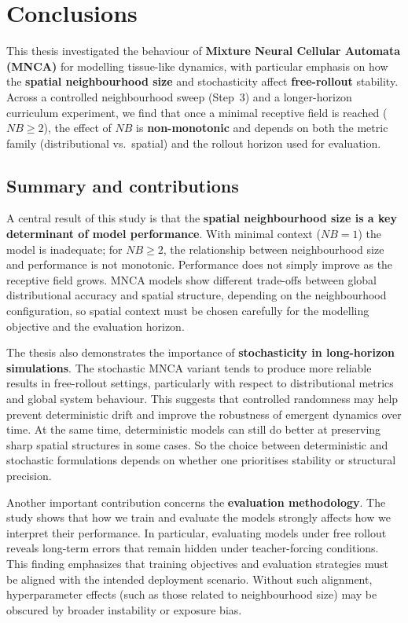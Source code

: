 \chapter{Conclusions}
\label{c:conc}

This thesis investigated the behaviour of \textbf{Mixture Neural Cellular Automata (MNCA)} for modelling tissue-like dynamics, with particular emphasis on how the \textbf{spatial neighbourhood size} and stochasticity affect \textbf{free-rollout} stability.
Across a controlled neighbourhood sweep (Step~3) and a longer-horizon curriculum experiment, we find that once a minimal receptive field is reached (\(NB\ge2\)), the effect of \(NB\) is \textbf{non-monotonic} and depends on both the metric family (distributional vs.\ spatial) and the rollout horizon used for evaluation.

\section{Summary and contributions}
\label{sec:conc:summary}

A central result of this study is that the \textbf{spatial neighbourhood size is a key determinant of model performance}.
With minimal context (\(NB=1\)) the model is inadequate; for \(NB \ge 2\), the relationship between neighbourhood size and performance is not monotonic.
Performance does not simply improve as the receptive field grows. MNCA models show different trade-offs between global distributional accuracy and spatial structure, depending on the neighbourhood configuration, so spatial context must be chosen carefully for the modelling objective and the evaluation horizon.

The thesis also demonstrates the importance of \textbf{stochasticity in long-horizon simulations}.
The stochastic MNCA variant tends to produce more reliable results in free-rollout settings, particularly with respect to distributional metrics and global system behaviour.
This suggests that controlled randomness may help prevent deterministic drift and improve the robustness of emergent dynamics over time.
At the same time, deterministic models can still do better at preserving sharp spatial structures in some cases. So the choice between deterministic and stochastic formulations depends on whether one prioritises stability or structural precision.

Another important contribution concerns the \textbf{evaluation methodology}.
The study shows that how we train and evaluate the models strongly affects how we interpret their performance.
In particular, evaluating models under free rollout reveals long-term errors that remain hidden under teacher-forcing conditions.
This finding emphasizes that training objectives and evaluation strategies must be aligned with the intended deployment scenario.
Without such alignment, hyperparameter effects (such as those related to neighbourhood size) may be obscured by broader instability or exposure bias.

